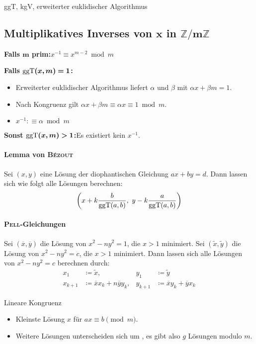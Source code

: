 \begin{algorithm}{ggT, kgV, erweiterter euklidischer Algorithmus}
\end{algorithm}

\subsection{Multiplikatives Inverses von $\boldsymbol{x}$ in $\boldsymbol{\mathbb{Z}/m\mathbb{Z}}$}
\textbf{Falls $\boldsymbol{m}$ prim:}\quad $x^{-1} \equiv x^{m-2} \bmod m$

\textbf{Falls $\boldsymbol{\text{ggT}(x, m) = 1}$:}
\begin{itemize}
	\item Erweiterter euklidischer Algorithmus liefert $\alpha$ und $\beta$ mit
	$\alpha x + \beta m = 1$.
	\item Nach Kongruenz gilt $\alpha x + \beta m \equiv \alpha x \equiv 1 \bmod m$.
	\item $x^{-1} :\equiv \alpha \bmod m$
\end{itemize}
\textbf{Sonst $\boldsymbol{\text{ggT}(x, m) > 1}$:}\quad Es existiert kein $x^{-1}$.

\paragraph{Lemma von \textsc{Bézout}}
Sei $(x, y)$ eine Lösung der diophantischen Gleichung $ax + by = d$.
Dann lassen sich wie folgt alle Lösungen berechnen:
\[
\left(x + k\frac{b}{\text{ggT}(a, b)},~y - k\frac{a}{\text{ggT}(a, b)}\right)
\]

\paragraph{\textsc{Pell}-Gleichungen}
Sei $(\overline{x}, \overline{y})$ die Lösung von $x^2 - ny^2 = 1$, die $x>1$ minimiert.
Sei $(\tilde{x}, \tilde{y})$ die Lösung von $x^2-ny^2 = c$, die $x>1$ minimiert. Dann lassen
sich alle Lösungen von $x^2-ny^2=c$ berechnen durch:
\begin{align*}
	x_1&\coloneqq \tilde{x}, & y_1&\coloneqq\tilde{y}\\
	x_{k+1}&\coloneqq \overline{x}x_k+n\overline{y}y_k, & y_{k+1}&\coloneqq\overline{x}y_k+\overline{y}x_k
\end{align*}

\begin{algorithm}{Lineare Kongruenz}
	\begin{itemize}
		\item Kleinste Lösung $x$ für $ax\equiv b\pmod{m}$.
		\item Weitere Lösungen unterscheiden sich um , es gibt
		also $g$ Lösungen modulo $m$.
	\end{itemize}
\end{algorithm}

